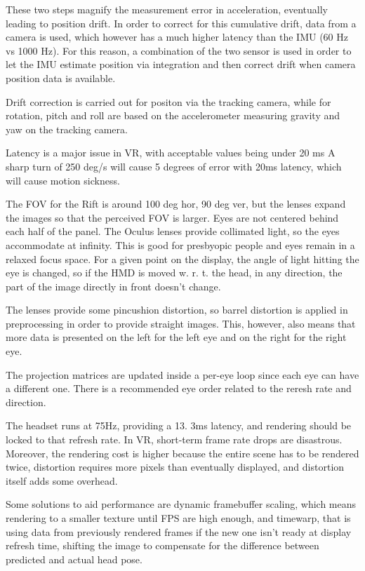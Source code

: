 \documentclass[a4paper]{article}
\begin{document}
These two steps magnify the measurement error in acceleration,
eventually leading to position drift.
In order to correct for this
cumulative drift, data from a camera is used, which however has a much
higher latency than the IMU (60 Hz vs 1000 Hz).
For this reason, a
combination of the two sensor is used in order to let the IMU estimate
position via integration and then correct drift when camera position
data is available.

Drift correction is carried out for positon via the tracking camera,
while for rotation, pitch and roll are based on the accelerometer
measuring gravity and yaw on the tracking camera.

Latency is a major issue in VR, with acceptable values being under 20 ms
A sharp turn of 250 deg/s will cause 5 degrees of error with 20ms
latency, which will cause motion sickness.

The FOV for the Rift is around 100 deg hor, 90 deg ver, but the lenses
expand the images so that the perceived FOV is larger.
Eyes are not
centered behind each half of the panel.
The Oculus lenses provide
collimated light, so the eyes accommodate at infinity.
This is good for
presbyopic people and eyes remain in a relaxed focus space.
For a given
point on the display, the angle of light hitting the eye is changed, so
if the HMD is moved w.
r.
t.
the head, in any direction, the part of the
image directly in front doesn't change.

The lenses provide some pincushion distortion, so barrel distortion is
applied in preprocessing in order to provide straight images.
This,
however, also means that more data is presented on the left for the left
eye and on the right for the right eye.

The projection matrices are updated inside a per-eye loop since each eye
can have a different one.
There is a recommended eye order related to
the reresh rate and direction.

The headset runs at 75Hz, providing a 13.
3ms latency, and rendering
should be locked to that refresh rate.
In VR, short-term frame rate
drops are disastrous.
Moreover, the rendering cost is higher because the
entire scene has to be rendered twice, distortion requires more pixels
than eventually displayed, and distortion itself adds some overhead.

Some solutions to aid performance are dynamic framebuffer scaling, which
means rendering to a smaller texture until FPS are high enough, and
timewarp, that is using data from previously rendered frames if the new
one isn't ready at display refresh time, shifting the image to
compensate for the difference between predicted and actual head pose.
\end{document}
